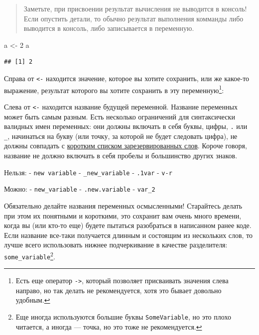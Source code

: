 \documentclass[]{book}
\newenvironment{Shaded}{\begin{snugshade}}{\end{snugshade}}
\newcommand{\DecValTok}[1]{\textcolor[rgb]{0.00,0.00,0.81}{#1}}
\newcommand{\StringTok}[1]{\textcolor[rgb]{0.31,0.60,0.02}{#1}}
\newcommand{\NormalTok}[1]{#1}
\begin{document}
\begin{quote}
Заметьте, при присвоении результат вычисления не выводится в консоль!
Если опустить детали, то обычно результат выполнения комманды либо
выводится в консоль, либо записывается в переменную.
\end{quote}

\begin{Shaded}
\begin{Highlighting}[]
\NormalTok{a <-}\StringTok{ }\DecValTok{2}
\NormalTok{a}
\end{Highlighting}
\end{Shaded}

\begin{verbatim}
## [1] 2
\end{verbatim}

Справа от \texttt{\textless{}-} находится значение, которое вы хотите
сохранить, или же какое-то выражение, результат которого вы хотите
сохранить в эту переменную\footnote{Есть еще оператор
  \texttt{-\textgreater{}}, который позволяет присваивать значения слева
  направо, но так делать не рекомендуется, хотя это бывает довольно
  удобным.}:

Слева от \texttt{\textless{}-} находится название будущей переменной.
Название переменных может быть самым разным. Есть несколько ограничений
для синтаксически валидных имен переменных: они должны включать в себя
буквы, цифры, \texttt{.} или \texttt{\_}, начинаться на букву (или
точку, за которой не будет следовать цифра), не должны совпадать с
\href{https://stat.ethz.ch/R-manual/R-devel/library/base/html/Reserved.html}{коротким
списком зарезервированных слов}. Короче говоря, название не должно
включать в себя пробелы и большинство других знаков.

Нельзя: - \texttt{new\ variable} - \texttt{\_new\_variable} -
\texttt{.1var} - \texttt{v-r}

Можно: - \texttt{new\_variable} - \texttt{.new.variable} -
\texttt{var\_2}

Обязательно делайте названия переменных осмысленными! Старайтесь делать
при этом их понятными и короткими, это сохранит вам очень много времени,
когда вы (или кто-то еще) будете пытаться разобраться в написанном ранее
коде. Если название все-таки получается длинным и состоящим из
нескольких слов, то лучше всего использовать нижнее подчеркивание в
качестве разделителя: \texttt{some\_variable}\footnote{Еще иногда
  используются большие буквы \texttt{SomeVariable}, но это плохо
  читается, а иногда --- точка, но это тоже не рекомендуется.}.
\end{document}
